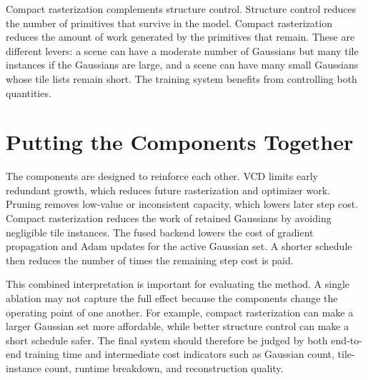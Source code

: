 Compact rasterization complements structure control. Structure control reduces the number of primitives that survive in the model. Compact rasterization reduces the amount of work generated by the primitives that remain. These are different levers: a scene can have a moderate number of Gaussians but many tile instances if the Gaussians are large, and a scene can have many small Gaussians whose tile lists remain short. The training system benefits from controlling both quantities.

\section{Putting the Components Together}

The components are designed to reinforce each other. VCD limits early redundant growth, which reduces future rasterization and optimizer work. Pruning removes low-value or inconsistent capacity, which lowers later step cost. Compact rasterization reduces the work of retained Gaussians by avoiding negligible tile instances. The fused backend lowers the cost of gradient propagation and Adam updates for the active Gaussian set. A shorter schedule then reduces the number of times the remaining step cost is paid.

This combined interpretation is important for evaluating the method. A single ablation may not capture the full effect because the components change the operating point of one another. For example, compact rasterization can make a larger Gaussian set more affordable, while better structure control can make a short schedule safer. The final system should therefore be judged by both end-to-end training time and intermediate cost indicators such as Gaussian count, tile-instance count, runtime breakdown, and reconstruction quality.
